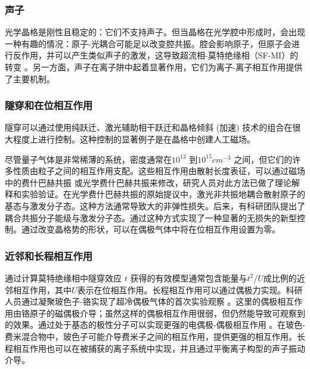 \subsubsection{声子}
光学晶格是刚性且稳定的：它们不支持声子。但当晶格在光学腔中形成时，会出现一种有趣的情况：原子-光耦合可能足以改变腔共振。腔会影响原子，但原子会进行反作用，并可以产生类似声子的激发\cite{maschler2005cold}，这导致超流相-莫特绝缘相（SF-MI）的转变 \cite{larson2008mott}。另一方面，声子在离子阱中起着显著作用，它们为离子-离子相互作用提供了主要机制\cite{mintert2001ion,porras2004effective}。

\subsubsection{隧穿和在位相互作用}

隧穿可以通过使用纯跃迁、激光辅助相干跃迁和晶格倾斜 (加速) 技术的组合在很大程度上进行控制\cite{Gao2023}。这种控制的显著例子是在晶格中创建人工磁场\cite{jaksch2003creation}。

尽管量子气体是非常稀薄的系统，密度通常在\( 10^{13} \) 到\( 10^{15} \)\( cm^{-3} \)
 之间，但它们的许多性质由粒子之间的相互作用支配。这些相互作用由散射长度表征，可以通过磁场中的费什巴赫共振 \cite{inouye1998observation,timmermans1999feshbach}或光学费什巴赫共振来修改，研究人员对此方法已做了理论解释\cite{fedichev1996influence}和实验验证\cite{thalhammer2005inducing}。在光学费什巴赫共振的原始提议中，激光非共振地耦合散射原子的基态与激发分子态。这种方法通常导致大的非弹性损失。后来，有科研团队提出了耦合共振分子能级与激发分子态\cite{bauer2009control}。通过这种方式实现了一种显著的无损失的新型控制。通过改变晶格势的形状，可以在偶极气体中将在位相互作用设置为零\cite{baranov2002ultracold}。

 \subsubsection{近邻和长程相互作用}
 通过计算莫特绝缘相中隧穿效应 \(t\) 获得的有效模型通常包含能量与\(t^2/U\)成比例的近邻相互作用，其中\(U\)表示在位相互作用。长程相互作用可以通过偶极力实现\cite{baranov2002ultracold,thalhammer2005inducing,lahaye2009physics}。科研人员通过凝聚玻色子-铬实现了超冷偶极气体的首次实验观察 \cite{griesmaier2005bose}。这里的偶极相互作用由铬原子的磁偶极介导；虽然这样的偶极相互作用很弱，但仍然能导致可观察到的效果\cite{stuhler2005magnetostriction}。通过处于基态的极性分子可以实现更强的电偶极-偶极相互作用 \cite{ni2008high}。在玻色-费米混合物中，玻色子可能介导费米子之间的相互作用，提供更强的相互作用。长程相互作用也可以在被捕获的离子系统中实现，并且通过平衡离子构型的声子振动介导。

